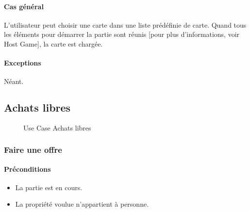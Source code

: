 \documentclass[a4paper,11pt]{report}
\begin{document}
\paragraph{Cas général}
L'utilisateur peut choisir une carte dans une liste prédéfinie de carte. Quand tous les éléments pour démarrer la partie
sont réunis [pour plus d'informations, voir Host Game], la carte est chargée.
\paragraph{Exceptions} Néant.

\newpage
\subsection{Achats libres}
\begin{figure}[ht]
    \caption{Use Case Achats libres}
\end{figure}
\subsubsection{Faire une offre}
\paragraph{Préconditions}
\begin{itemize}
 \item La partie est en cours.
 \item La propriété voulue n'appartient à personne.
\end{itemize}
\end{document}
